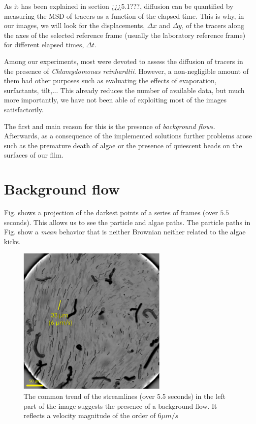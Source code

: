 As it has been explained in section ¿¿¿5.1???, diffusion can be quantified by measuring the MSD of tracers as a function of the elapsed time. This is why, in our images, we will look for the displacements, $\Delta x$ and $\Delta y$, of the tracers along the axes of the selected reference frame (usually the laboratory reference frame) for different elapsed times, $\Delta t$.

Among our experiments, most were devoted to assess the diffusion of tracers in the presence of \textit{Chlamydomonas reinhardtii}. However, a non-negligible amount of them had other purposes such as evaluating the effects of evaporation, surfactants, tilt,... This already reduces the number of available data, but much more importantly, we have not been able of exploiting most of the images satisfactorily.

The first and main reason for this is the presence of \textit{background flows}. Afterwards, as a consequence of the implemented solutions further problems arose such as the premature death of algae or the presence of quiescent beads on the surfaces of our film.

\section{Background flow}

Fig. \label{backg_flow} shows a projection of the darkest points of a series of frames (over $5.5$ seconds). This allows us to see the particle and algae paths. The particle paths in Fig. \label{backg_flow} show a \textit{mean} behavior that is neither Brownian neither related to the algae kicks.

\begin{figure}[H]
	\centering
	\includegraphics[width=0.65\textwidth]{archivos/backg_flow.png}
	\caption{The common trend of the streamlines (over 5.5 seconds) in the left part of the image suggests the presence of a background flow. It reflects a velocity magnitude of the order of $6 \mu m / s$}
	\label{backg_flow}
\end{figure}

